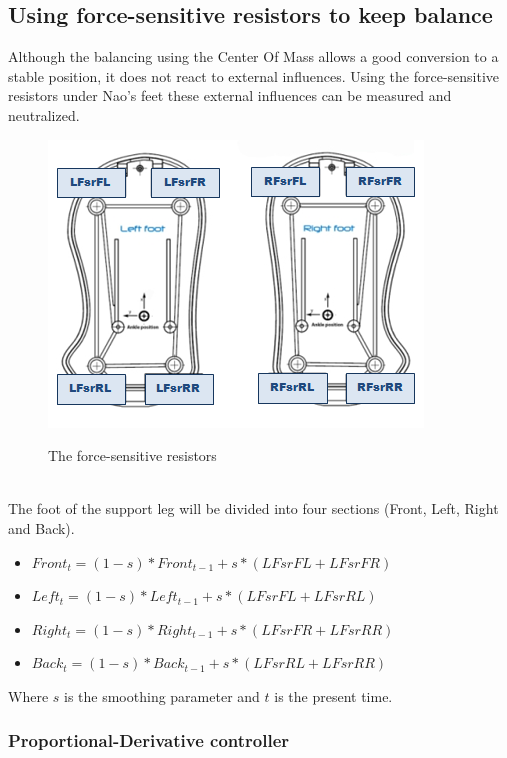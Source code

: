 \documentclass[a4paper]{article}
\begin{document}
\subsection{Using force-sensitive resistors to keep balance}

Although the balancing using the Center Of Mass allows a good conversion to a
stable position, it does not react to external influences.
Using the force-sensitive resistors under Nao's feet these external influences can be measured and neutralized.
\begin{figure}[htb]
	\centering
	\includegraphics[scale=0.75]{pics/naosfeet.jpg}
	\label{fig:fsr_plot}
	\caption{The force-sensitive resistors}
\end{figure}\\
The foot of the support leg will be divided into four sections (Front, Left, Right and Back). 
\begin{itemize}
    \item $Front_t = (1-s) * Front_{t-1} + s * (LFsrFL + LFsrFR)$
    \item $Left_t = (1-s) * Left_{t-1} + s *(LFsrFL + LFsrRL)$
    \item $Right_t = (1-s) * Right_{t-1} + s *(LFsrFR + LFsrRR)$
    \item $Back_t = (1-s) * Back_{t-1} + s *(LFsrRL + LFsrRR)$ 
\end{itemize}
Where $s$ is the smoothing parameter and $t$ is the present time.

\subsubsection{Proportional-Derivative controller}
\end{document}
